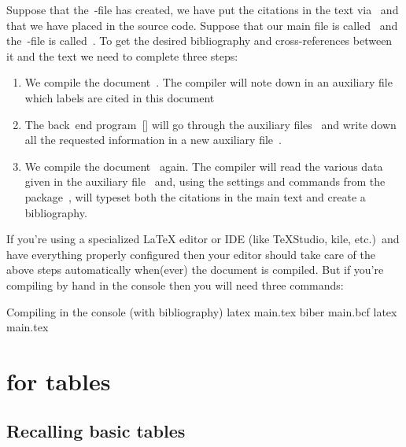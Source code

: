 Suppose that the~-file has created, we have put the citations in the text via~ and that we have placed  in the source code.
Suppose that our main file is called~ and the~-file is called~.
To get the desired bibliography and cross-references between it and the text we need to complete three steps:
\begin{enumerate}
  \item
    We compile the document~.
    The compiler will note down in an auxiliary file~ which labels are cited in this document
  \item
    The back~end program~[\appname] will go through the auxiliary files~ and write down all the requested information in a new auxiliary file~.
  \item
    We compile the document~ again.
    The compiler will read the various data given in the auxiliary file~ and, using the settings and commands from the package~, will typeset both the citations in the main text and create a bibliography.
\end{enumerate}
If you’re using a specialized {\LaTeX} editor or IDE (like {\TeX}Studio, kile, etc.)\ and have everything properly configured then your editor should take care of the above steps automatically when(ever) the document is compiled.
But if you’re compiling by hand in the console then you will need three commands:
\begin{showcode}{Compiling in the console (with bibliography)}
latex main.tex
biber main.bcf
latex main.tex
\end{showcode}






\section{ for tables}



\subsection{Recalling basic tables}

